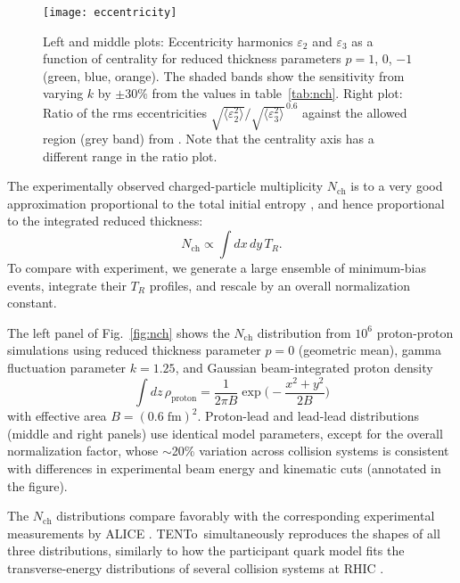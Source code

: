 \documentclass[aps,prc,reprint,amsmath,nofootinbib]{revtex4-1}
\newcommand{\trento}{T\raisebox{-.5ex}{R}ENTo}
\newcommand{\nch}{N_\text{ch}}
\newcommand{\eccratio}{\sqrt{\langle \varepsilon_2^2 \rangle}/\sqrt{\langle \varepsilon_3^2 \rangle}^{\,0.6}}
\begin{document}
\begin{figure*}[t]
  \texttt{[image: eccentricity]}
  \caption{
    \label{fig:eccen}
    Left and middle plots:
    Eccentricity harmonics $\varepsilon_2$ and $\varepsilon_3$ as a function of centrality for reduced thickness parameters $p = 1$, 0, $-1$ (green, blue, orange).
    The shaded bands show the sensitivity from varying $k$ by $\pm30\%$ from the values in table~\ref{tab:nch}.
    Right plot:
    Ratio of the rms eccentricities $\eccratio$ against the allowed region (grey band) from \cite{Retinskaya:2013gca}.
    Note that the centrality axis has a different range in the ratio plot.
  }
\end{figure*}

The experimentally observed charged-particle multiplicity $\nch$ is to a very good approximation proportional to the total initial entropy \cite{Song:2008si}, and hence proportional to the integrated reduced thickness:
\begin{equation}
  \nch \propto \int dx \, dy \, T_R.
\end{equation}
To compare with experiment, we generate a large ensemble of minimum-bias events, integrate their $T_R$ profiles, and rescale by an overall normalization constant.

The left panel of Fig.~\ref{fig:nch} shows the $\nch$ distribution from $10^6$ proton-proton simulations
using reduced thickness parameter $p = 0$ (geometric mean), gamma fluctuation parameter $k = 1.25$, and
Gaussian beam-integrated proton density
\begin{equation}
  \int dz \, \rho_\text{proton} = \frac{1}{2\pi B} \exp\biggr( -\frac{x^2 + y^2}{2B} \biggr)
\end{equation}
with effective area $B = (0.6\;\text{fm})^2$.
Proton-lead and lead-lead distributions (middle and right panels) use identical model parameters, except for the overall normalization factor, whose $\sim$20\% variation across collision systems is consistent with differences in experimental beam energy and kinematic cuts (annotated in the figure).

The $\nch$ distributions compare favorably with the corresponding experimental measurements by ALICE \cite{Aamodt:2010ft,Abelev:2014mda}.
\trento\ simultaneously reproduces the shapes of all three distributions, similarly to how the participant quark model fits the transverse-energy distributions of several collision systems at RHIC \cite{Adler:2013aqf}.
\end{document}

